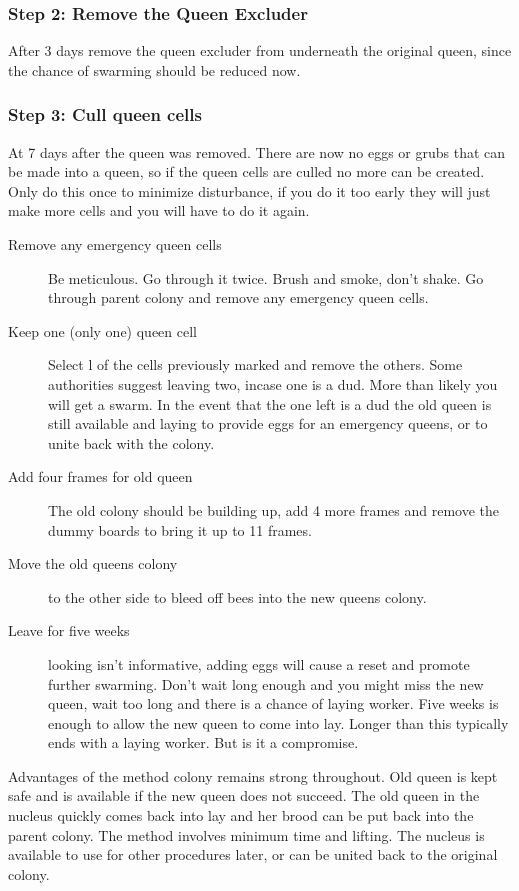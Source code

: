 \subsubsection*{Step 2: Remove the Queen Excluder}

After 3 days remove the queen excluder from underneath the original queen,
since the chance of swarming should be reduced now.

\subsubsection*{Step 3: Cull queen cells}

At 7 days after the queen was removed.
There are now no eggs or grubs that can be made into a queen, 
so if the queen cells are culled no more can be created.
Only do this once to minimize disturbance,
if you do it too early they will just make more cells and you will have to do it again.

\begin{description}
  \item[Remove any emergency queen cells] Be meticulous.  Go through it twice.  Brush and smoke, don't shake.
  Go through parent colony and remove any emergency queen cells.
  \item[Keep one (only one) queen cell]
  Select l of the cells previously marked and remove the others.
  Some authorities suggest leaving two, incase one is a dud.
  More than likely you will get a swarm.
  In the event that the one left is a dud the old queen is still available and laying to provide eggs for an emergency queens,
  or to unite back with the colony.
  \item[Add four frames for old queen] The old colony should be building up, add 4 more frames and remove the dummy boards to bring it up to 11 frames.
  \item[Move the old queens colony] to the other side to bleed off bees into the new queens colony.
  \item[Leave for five weeks] looking isn't informative, adding eggs will cause a reset and promote further swarming.
  Don't wait long enough and you might miss the new queen, wait too long and there is a chance of laying worker.
  Five weeks is enough to allow the new queen to come into lay.  Longer than this typically ends with a laying worker.
  But is it a compromise.
\end{description}

Advantages of the method
colony remains strong throughout.
Old queen is kept safe and is available if the new queen does not succeed.
The old queen in the nucleus quickly comes back into lay and her brood can be put back into the parent colony.
The method involves minimum time and lifting.
The nucleus is available to use for other procedures later, or can be united back to the original colony.

